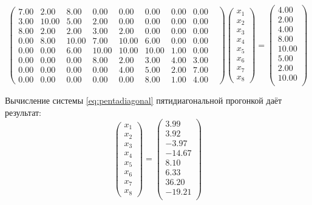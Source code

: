 \documentclass[a4paper, fontsize=14pt]{article}
\begin{document}
\begin{equation}
    \label{eq:pentadiagonal}
    \begin{pmatrix}
        7.00 & 2.00  & 8.00  & 0.00  & 0.00  & 0.00  & 0.00 & 0.00 & \\
        3.00 & 10.00 & 5.00  & 2.00  & 0.00  & 0.00  & 0.00 & 0.00 & \\
        8.00 & 2.00  & 2.00  & 3.00  & 2.00  & 0.00  & 0.00 & 0.00 & \\
        0.00 & 8.00  & 10.00 & 7.00  & 10.00 & 6.00  & 0.00 & 0.00 & \\
        0.00 & 0.00  & 6.00  & 10.00 & 10.00 & 10.00 & 1.00 & 0.00 & \\
        0.00 & 0.00  & 0.00  & 8.00  & 2.00  & 3.00  & 4.00 & 3.00 & \\
        0.00 & 0.00  & 0.00  & 0.00  & 4.00  & 5.00  & 2.00 & 7.00 & \\
        0.00 & 0.00  & 0.00  & 0.00  & 0.00  & 8.00  & 1.00 & 4.00 &
    \end{pmatrix}
    \begin{pmatrix}
        x_1 \\x_2\\x_3\\x_4\\x_5\\x_6\\x_7\\x_8
    \end{pmatrix}
    =
    \begin{pmatrix}
        4.00 \\  2.00\\  4.00\\  8.00\\ 10.00\\  5.00\\  2.00\\ 10.00\\
    \end{pmatrix}
\end{equation}

Вычисление системы \eqref{eq:pentadiagonal} пятидиагональной прогонкой даёт результат:
\begin{equation*}
    \begin{pmatrix}
        x_1 \\x_2\\x_3\\x_4\\x_5\\x_6\\x_7\\x_8
    \end{pmatrix}
    =
    \begin{pmatrix}
        3.99 \\  3.92\\ -3.97\\-14.67\\  8.10\\  6.33\\ 36.20\\-19.21\\
    \end{pmatrix}
\end{equation*}
\end{document}
